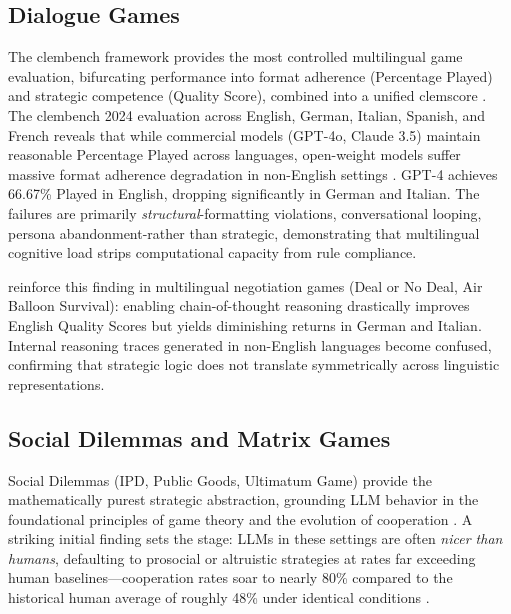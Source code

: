 \documentclass[11pt]{article}
\begin{document}
\subsection{Dialogue Games}
\label{sec:dialogue}

The clembench framework provides the most controlled multilingual game evaluation, bifurcating performance into format adherence (Percentage Played) and strategic competence (Quality Score), combined into a unified clemscore \citep{chalamalasetti2023clembench, schlangen2025clembench}. The clembench 2024 evaluation across English, German, Italian, Spanish, and French reveals that while commercial models (GPT-4o, Claude 3.5) maintain reasonable Percentage Played across languages, open-weight models suffer massive format adherence degradation in non-English settings \citep{beyer2024clembench}. GPT-4 achieves 66.67\% Played in English, dropping significantly in German and Italian. The failures are primarily \textit{structural}-formatting violations, conversational looping, persona abandonment-rather than strategic, demonstrating that multilingual cognitive load strips computational capacity from rule compliance.

\citet{hakimov2026pricethought} reinforce this finding in multilingual negotiation games (Deal or No Deal, Air Balloon Survival): enabling chain-of-thought reasoning drastically improves English Quality Scores but yields diminishing returns in German and Italian. Internal reasoning traces generated in non-English languages become confused, confirming that strategic logic does not translate symmetrically across linguistic representations.

\subsection{Social Dilemmas and Matrix Games}
\label{sec:social_dilemmas}

Social Dilemmas (IPD, Public Goods, Ultimatum Game) provide the mathematically purest strategic abstraction, grounding LLM behavior in the foundational principles of game theory \citep{neumann1944theory} and the evolution of cooperation \citep{axelrod1984evolution, huynh2026moreatstake, akata2025playing}. A striking initial finding sets the stage: LLMs in these settings are often \textit{nicer than humans}, defaulting to prosocial or altruistic strategies at rates far exceeding human baselines---cooperation rates soar to nearly 80\% compared to the historical human average of roughly 48\% under identical conditions \citep{fontana2024nicer, za2026towards, wang2026discovering}.
\end{document}
